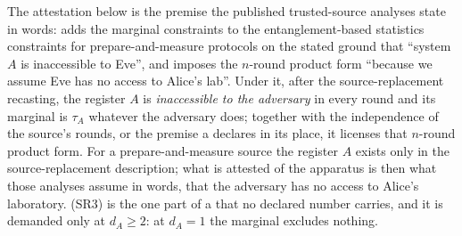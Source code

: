 
The attestation below is the premise the published trusted-source analyses
state in words: \cite[Eqs.~(36)--(39)]{winick2018reliable} adds the marginal
constraints to the entanglement-based statistics constraints for
prepare-and-measure protocols on the stated ground that ``system $A$ is
inaccessible to Eve'', and \cite[Rem.~1]{kamin2025renyi} imposes the
$n$-round product form ``because we assume Eve has no access to Alice's
lab''. Under it, after the source-replacement recasting, the register $A$ is
\emph{inaccessible to the adversary} in every round and its marginal is
$\tau_A$ whatever the adversary does; together with the independence of the
source's rounds, or the premise a  declares in its place,
it licenses that $n$-round product form. For a prepare-and-measure source the
register $A$ exists only in the source-replacement description; what is
attested of the apparatus is then what those analyses assume in words, that
the adversary has no access to Alice's laboratory. (SR3) is the one part of a
 that no declared number carries, and it
is demanded only at $d_A\ge2$: at $d_A=1$ the marginal excludes nothing.

